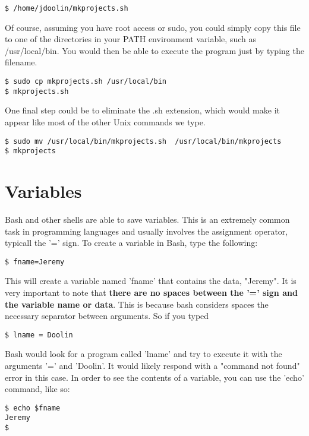 \begin{verbatim}
$ /home/jdoolin/mkprojects.sh
\end{verbatim}

Of course, assuming you have root access or sudo, you could simply copy this file to one of the directories in your PATH environment variable, such as /usr/local/bin.  You would then be able to execute the program just by typing the filename.

\begin{verbatim}
$ sudo cp mkprojects.sh /usr/local/bin
$ mkprojects.sh
\end{verbatim}

One final step could be to eliminate the .sh extension, which would make it appear like most of the other Unix commands we type.

\begin{verbatim}
$ sudo mv /usr/local/bin/mkprojects.sh  /usr/local/bin/mkprojects
$ mkprojects
\end{verbatim}

\section{Variables}

Bash and other shells are able to save variables.  This is an extremely common task in programming languages and usually involves the assignment operator, typicall the '=' sign.  To create a variable in Bash, type the following:

\begin{verbatim}
$ fname=Jeremy
\end{verbatim}

This will create a variable named 'fname' that contains the data, "Jeremy".  It is very important to note that \textbf{there are no spaces between the '=' sign and the variable name or data}.  This is because bash considers spaces the necessary separator between arguments.  So if you typed

\begin{verbatim}
$ lname = Doolin
\end{verbatim}

Bash would look for a program called 'lname' and try to execute it with the arguments '=' and 'Doolin'.  It would likely respond with a "command not found" error in this case.  In order to see the contents of a variable, you can use the 'echo' command, like so:

\begin{verbatim}
$ echo $fname
Jeremy
$ 
\end{verbatim}

